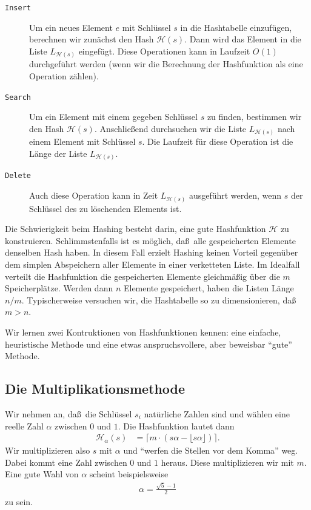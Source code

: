 \documentclass[10pt,reqno]{amsart}
\numberwithin{equation}{section}
\newcommand\cH{\mathcal H}
\begin{document}
\begin{description}
	\item[{\tt Insert}]
		Um ein neues Element $e$ mit Schl\"ussel $s$ in die Hashtabelle einzuf\"ugen, berechnen wir zun\"achst den Hash $\cH(s)$.
		Dann wird das Element in die Liste $L_{\cH(s)}$ eingef\"ugt.
		Diese Operationen kann in Laufzeit $O(1)$ durchgef\"uhrt werden (wenn wir die Berechnung der Hashfunktion als eine Operation z\"ahlen).
	\item[\tt Search]
		Um ein Element mit einem gegeben Schl\"ussel $s$ zu finden, bestimmen wir den Hash $\cH(s)$. 
		Anschlie\ss end durchsuchen wir die Liste $L_{\cH(s)}$ nach einem Element mit Schl\"ussel $s$.
		Die Laufzeit f\"ur diese Operation ist die L\"ange der Liste $L_{\cH(s)}$.
	\item[\tt Delete] Auch diese Operation kann in Zeit $L_{\cH(s)}$ ausgef\"uhrt werden, wenn $s$ der Schl\"ussel des zu l\"oschenden Elements ist.
\end{description}

Die Schwierigkeit beim Hashing besteht darin, eine gute Hashfunktion $\cH$ zu konstruieren.
Schlimmstenfalls ist es m\"oglich, da\ss\ alle gespeicherten Elemente denselben Hash haben.
In diesem Fall erzielt Hashing keinen Vorteil gegen\"uber dem simplen Abspeichern aller Elemente in einer verketteten Liste.
Im Idealfall verteilt die Hashfunktion die gespeicherten Elemente gleichm\"a\ss ig \"uber die $m$ Speicherpl\"atze.
Werden dann $n$ Elemente gespeichert, haben die Listen L\"ange $n/m$.
Typischerweise versuchen wir, die Hashtabelle so zu dimensionieren, da\ss\ $m>n$.

Wir lernen zwei Kontruktionen von Hashfunktionen kennen: eine einfache, heuristische Methode und eine etwas anspruchsvollere, aber beweisbar ``gute'' Methode.

\subsection{Die Multiplikationsmethode}\label{sec_hash_mult}
Wir nehmen an, da\ss\ die Schl\"ussel $s_i$ nat\"urliche Zahlen sind und w\"ahlen eine reelle Zahl $\alpha$ zwischen $0$ und $1$.
Die Hashfunktion lautet dann
	\begin{align*}
		\cH_\alpha(s)&=\lceil m \cdot (s\alpha-\lfloor s\alpha\rfloor)\rceil.
	\end{align*}
Wir multiplizieren also $s$ mit $\alpha$ und ``werfen die Stellen vor dem Komma'' weg.
Dabei kommt eine Zahl zwischen $0$ und $1$ heraus.
Diese multiplizieren wir mit $m$.
Eine gute Wahl von $\alpha$ scheint beispielsweise
\begin{align*}
	\alpha=\frac{\sqrt 5-1}2
\end{align*}
zu sein.
\end{document}
